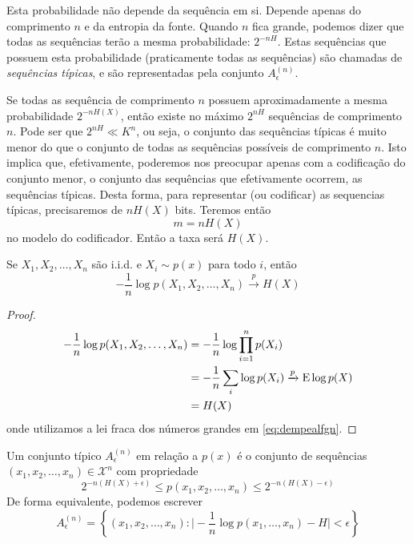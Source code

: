 Esta probabilidade não depende da sequência em si. Depende apenas do comprimento $n$ e
da entropia da fonte.
Quando $n$ fica grande, podemos dizer que todas as sequências terão a mesma probabilidade: $2^{-nH}$.
Estas sequências que possuem esta probabilidade (praticamente todas as sequências) são
chamadas de \emph{sequências típicas}, e são representadas pela conjunto $A_\epsilon^{(n)}$.

Se todas as sequência de comprimento $n$ possuem aproximadamente a mesma probabilidade $2^{-nH(X)}$,
então existe no máximo $2^{nH}$ sequências de comprimento $n$. Pode ser que $2^{nH} \ll K^n$,
ou seja, o conjunto das sequências típicas é muito menor do que o conjunto de todas as sequências
possíveis de comprimento $n$. Isto implica que, efetivamente, poderemos nos preocupar apenas
com a codificação do conjunto menor, o conjunto das sequências que efetivamente ocorrem, as sequências
típicas. Desta forma, para representar (ou codificar) as sequencias típicas, precisaremos de
$nH(X)$ bits. Teremos então
\begin{equation}
m = nH(X)
\end{equation}
no modelo do codificador. Então a taxa será $H(X)$.


\begin{theorem}\label{thm-prop-eqp-ass}
  Se $X_1, X_2, \ldots, X_n$ são i.i.d. e $X_i \sim p(x)$ para todo $i$, então
  \begin{equation}\label{eq-pX1X2Xn-H}
  -\frac{1}{n} \log p(X_1, X_2, \ldots, X_n) \xrightarrow{p} H(X)
  \end{equation}
\end{theorem}
\begin{proof}
  \begin{subequations}
  \begin{align}
  -\frac{1}{n} \log p(X_1, X_2, \ldots, X_n) &= - \frac{1}{n} \log \prod_{i=1}^n p(X_i) \\
                                             &= - \frac{1}{n} \sum_i \log p(X_i) \xrightarrow{p} \E \log p(X) \label{eq:dempealfgn}\\
                                             &= H(X)
  \end{align}
  \end{subequations}
  onde utilizamos a lei fraca dos números grandes em \ref{eq:dempealfgn}.
  \end{proof}


\begin{definition}
  Um conjunto típico $A_\epsilon^{(n)}$ em relação a $p(x)$ é o conjunto de sequências
  $(x_1,x_2,\ldots,x_n) \in \mathcal{X}^n$ com propriedade
  \begin{equation}
  2^{-n(H(X)+\epsilon)} \leq p(x_1, x_2, \ldots, x_n) \leq 2^{-n(H(X)-\epsilon)}
  \end{equation}
  De forma equivalente, podemos escrever
  \begin{equation}
  A_\epsilon^{(n)} = \left\{ (x_1, x_2, \ldots, x_n) : \vert - \frac{1}{n} \log p(x_1, \ldots, x_n) - H \vert < \epsilon \right\}
  \end{equation}
\end{definition}



